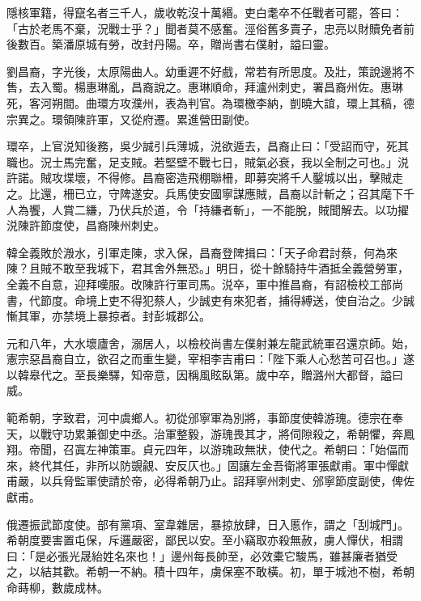 \begin{pinyinscope}
 隱核軍籍，得竄名者三千人，歲收乾沒十萬緡。吏白耄卒不任戰者可罷，答曰：「古於老馬不棄，況戰士乎？」聞者莫不感奮。涇俗舊多賣子，忠亮以財贖免者前後數百。築潘原城有勞，改封丹陽。卒，贈尚書右僕射，謚曰靈。



 劉昌裔，字光後，太原陽曲人。幼重遲不好戲，常若有所思度。及壯，策說邊將不售，去入蜀。楊惠琳亂，昌裔說之。惠琳順命，拜瀘州刺史，署昌裔州佐。惠琳死，客河朔間。曲環方攻濮州，表為判官。為環檄李納，剴曉大誼，環上其稿，德宗異之。環領陳許軍，又從府遷。累進營田副使。



 環卒，上官涚知後務，吳少誠引兵薄城，涚欲遁去，昌裔止曰：「受詔而守，死其職也。況士馬完奮，足支賊。若堅壁不戰七日，賊氣必衰，我以全制之可也。」涚許諾。賊攻堞壞，不得修。昌裔密造飛棚聯柵，即募突將千人鑿城以出，擊賊走之。比還，柵已立，守陴遂安。兵馬使安國寧謀應賊，昌裔以計斬之；召其麾下千人為饗，人賞二縑，乃伏兵於道，令「持縑者斬」，一不能脫，賊聞解去。以功擢涚陳許節度使，昌裔陳州刺史。



 韓全義敗於溵水，引軍走陳，求入保，昌裔登陴揖曰：「天子命君討蔡，何為來陳？且賊不敢至我城下，君其舍外無恐。」明日，從十餘騎持牛酒抵全義營勞軍，全義不自意，迎拜嘆服。改陳許行軍司馬。涚卒，軍中推昌裔，有詔檢校工部尚書，代節度。命境上吏不得犯蔡人，少誠吏有來犯者，捕得縛送，使自治之。少誠慚其軍，亦禁境上暴掠者。封彭城郡公。



 元和八年，大水壞廬舍，溺居人，以檢校尚書左僕射兼左龍武統軍召還京師。始，憲宗惡昌裔自立，欲召之而重生變，宰相李吉甫曰：「陛下乘人心愁苦可召也。」遂以韓皋代之。至長樂驛，知帝意，因稱風眩臥第。歲中卒，贈潞州大都督，謚曰威。



 範希朝，字致君，河中虞鄉人。初從邠寧軍為別將，事節度使韓游瑰。德宗在奉天，以戰守功累兼御史中丞。治軍整毅，游瑰畏其才，將伺隙殺之，希朝懼，奔鳳翔。帝聞，召寘左神策軍。貞元四年，以游瑰政無狀，使代之。希朝曰：「始偪而來，終代其任，非所以防覬覦、安反仄也。」固讓左金吾衛將軍張獻甫。軍中憚獻甫嚴，以兵脅監軍使請於帝，必得希朝乃止。詔拜寧州刺史、邠寧節度副使，俾佐獻甫。



 俄遷振武節度使。部有黨項、室韋雜居，暴掠放肆，日入慝作，謂之「刮城門」。希朝度要害置屯保，斥邏嚴密，鄙民以安。至小竊取亦殺無赦，虜人憚伏，相謂曰：「是必張光晟紿姓名來也！」邊州每長帥至，必效橐它駿馬，雖甚廉者猶受之，以結其歡。希朝一不納。積十四年，虜保塞不敢橫。初，單于城池不樹，希朝命蒔柳，數歲成林。




\end{pinyinscope}

